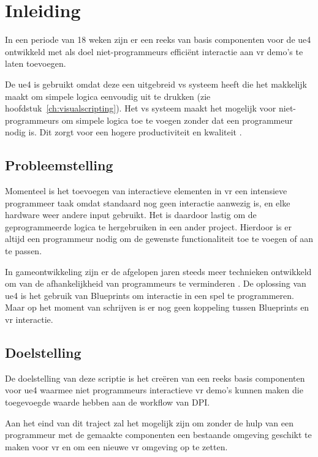 \chapter{Inleiding}

In een periode van 18 weken zijn er een reeks van basis componenten voor de \gls{ue4} ontwikkeld met als doel niet-programmeurs efficiënt interactie aan \gls{vr} demo’s te laten toevoegen.

De \gls{ue4} is gebruikt omdat deze een uitgebreid \gls{vs} systeem heeft die het makkelijk maakt om simpele logica eenvoudig uit te drukken (zie hoofdstuk~\ref{ch:visualscripting}). Het \gls{vs} systeem maakt het mogelijk voor niet-programmeurs om simpele logica toe te voegen zonder dat een programmeur nodig is. Dit zorgt voor een hogere productiviteit en kwaliteit \cite{Cutumisu200732}.

\section{Probleemstelling}

Momenteel is het toevoegen van interactieve elementen in \gls{vr} een intensieve programmeer taak omdat standaard nog geen interactie aanwezig is, en elke hardware weer andere input gebruikt. Het is daardoor lastig om de geprogrammeerde logica te hergebruiken in een ander project. Hierdoor is er altijd een programmeur nodig om de gewenste functionaliteit toe te voegen of aan te passen. 

In gameontwikkeling zijn er de afgelopen jaren steeds meer technieken ontwikkeld om van de afhankelijkheid van programmeurs te verminderen \cite{Cutumisu200732, ambientbehav}. De oplossing van \gls{ue4} is het gebruik van Blueprints om interactie in een spel te programmeren. Maar op het moment van schrijven is er nog geen koppeling tussen Blueprints en \gls{vr} interactie.

\section{Doelstelling}

De doelstelling van deze scriptie is het creëren van een reeks basis componenten voor \gls{ue4} waarmee niet programmeurs interactieve \gls{vr} demo’s kunnen maken die toegevoegde waarde hebben aan de workflow van DPI.

Aan het eind van dit traject zal het mogelijk zijn om zonder de hulp van een programmeur met de gemaakte componenten een bestaande omgeving geschikt te maken voor \gls{vr} en om een nieuwe \gls{vr} omgeving op te zetten.

